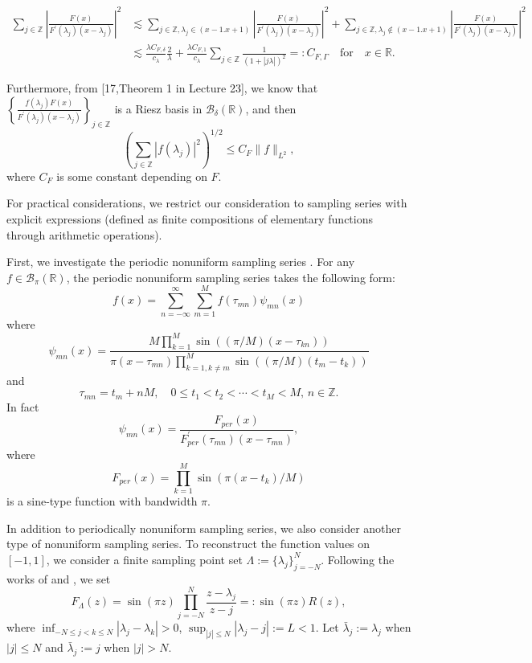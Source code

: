 \documentclass[a4paper]{article}
\numberwithin{equation}{section}
\begin{document}
\begin{equation*}\begin{split}
\sum_{j\in\mathbb{Z}} \left|\frac{F(x)}{F^{'}(\lambda_{j})(x-\lambda_{j})}\right|^{2}&\lesssim \sum_{j\in\mathbb{Z},\lambda_{j}\in (x-1.x+1)} \left|\frac{F(x)}{F^{'}(\lambda_{j})(x-\lambda_{j})}\right|^{2}+\sum_{j\in\mathbb{Z},\lambda_{j}\notin (x-1.x+1)} \left|\frac{F(x)}{F^{'}(\lambda_{j})(x-\lambda_{j})}\right|^{2}\\&\lesssim \frac{\lambda C_{F,\delta}}{c_{\lambda}}\frac{2}{\lambda}+\frac{\lambda C_{F,1}}{c_{\lambda}}\sum_{j\in\mathbb{Z}}\frac{1}{(1+|j\lambda|)^2} =: C_{F, \Gamma} \quad \text{for} \quad x\in \mathbb{R}.\end{split} 
\end{equation*}

Furthermore, from [17,Theorem 1 in Lecture 23], we know that $\left\{\frac{f(\lambda_{j})F(x)}{F^{'}(\lambda_{j})(x-\lambda_{j})} \right\}_{j\in \mathbb{Z}}$ is a Riesz basis   in  $\mathcal{B}_{\delta}(\mathbb{R})$, and then \begin{equation}\label{eq24}(\sum_{j\in \mathbb{Z}}|f(\lambda_{j})|^2)^{1/2}\le C_{F}\|f\|_{L^2},\end{equation} where $C_{F}$ is some constant depending on $F$.

For practical considerations, we restrict our consideration to sampling series with explicit expressions (defined as finite compositions of elementary functions through arithmetic operations). 


First, we investigate the periodic nonuniform sampling series \cite{strohmer2006fast,annaby2016bounds}. For any $f\in \mathcal{B}_{\pi}(\mathbb{R})$,  the periodic nonuniform sampling series takes the following form:
\begin{equation}\label{eq33}
f(x) = \sum_{n=-\infty}^{\infty} \sum_{m=1}^{M} f(\tau_{mn}) \psi_{mn}(x)
\end{equation}
where 
\[
\psi_{mn}(x) = \frac{M \prod_{k=1}^{M} \sin((\pi/M)(x - \tau_{kn}))}{\pi(x - \tau_{mn}) \prod_{k=1,k \neq m}^{M} \sin((\pi/M)(t_m - t_k))}
\]
and
\[
\tau_{mn} = t_m + nM, \quad 0 \leq t_1 < t_2 < \cdots < t_M < M, \, n \in \mathbb{Z}.
\]
In fact $$\psi_{mn}(x)=\frac{F_{per}(x)}{F_{per}^{'}(\tau_{mn})(x-\tau_{mn})},$$ where \begin{equation}\label{per}
F_{per}(x)=\prod_{k=1}^{M}\sin(\pi(x-t_{k})/M)\end{equation} is a sine-type function with bandwidth $\pi$.

In addition to periodically nonuniform sampling series, we also consider another type of nonuniform sampling series. To reconstruct the function values on $[-1,1]$, we consider a finite sampling point set $\Lambda:=\{\lambda_{j}\}_{j=-N}^{N}$. Following the works of \cite{selva2008functionally} and \cite{yang2025exponential}, we set 
\begin{equation}\label{genxin}
F_{\Lambda}(z)=\sin(\pi z) \prod_{j=- N }^{N} \frac{z-\lambda_j}{z-j}=:\sin(\pi z)R(z),
\end{equation}  where $\inf_{-N\le j<k\le N}|\lambda_{j}-\lambda_{k}|>0$, $\sup_{|j|\le N}|\lambda_{j}-j|:=L<1$. Let $\bar{\lambda}_{j}:=\lambda_j$ when $|j|\le N$ and $\bar{\lambda}_{j}:=j$ when $|j|>N$. 
\end{document}
